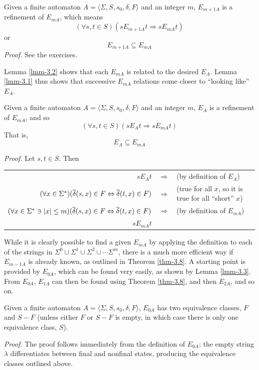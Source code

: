 \begin{lmm}\label{lmm-3.1}
Given a finite automaton $A =\langle\Sigma,S,s_0,\delta,F\rangle$ and an integer
$m$, $E_{m+1A}$ is a refinement of $E_{mA}$, which means
\[ (\forall s,t \in S)(s E_{m+1A}t \Rightarrow s E_{mA}t) \]
or
\[ E_{m+1A} \subseteq E_{mA} \]
\emph{Proof.} See the exercises.
\end{lmm}

Lemma \ref{lmm-3.2} shows that each $E_{mA}$ is related to the desired $E_A$. Lemma \ref{lmm-3.1}
thus shows that successive $E_{mA}$ relations come closer to ``looking like''
$E_A$.

\begin{lmm}\label{lmm-3.2}
Given a finite automaton $A =\langle\Sigma,S,s_0,\delta,F\rangle$ and an integer
$m$, $E_A$ is a refinement of $E_{mA}$, and so
\[ (\forall s,t \in S)(s E_A t \Rightarrow s E_{mA} t) \]
That is,
\[ E_A \subseteq E_{mA} \]

\emph{Proof.} Let $s,t \in S$. Then
\begin{center}
\begin{tabular}{rcl}
$s E_A t$ & $\Rightarrow$ & (by definition of $E_A$) \\
$(\forall x \in \Sigma^*)(\overline{\delta}(s,x) \in F \Leftrightarrow \overline{\delta}(t,x) \in F)$ &
  $\Rightarrow$ & (true for all $x$, so it is true for all ``short'' $x$)\\
$(\forall x \in \Sigma^* \ni |x| \leq m)(\overline{\delta}(s,x) \in F \Leftrightarrow
\overline{\delta}(t,x) \in F)$ & $\Rightarrow$ & (by definition of $E_{mA}$) \\
$s E_{mA} t$
\end{tabular}
\end{center}
\end{lmm}

While it is clearly possible to find a given $E_{mA}$ by applying the definition
to each of the strings in $\Sigma^0 \cup \Sigma^1 \cup \Sigma^2 \cup \cdots
\Sigma^m$, there is a much more efficient way if $E_{m-1A}$ is already known, as
outlined in Theorem \ref{thm-3.8}. A starting point is provided by $E_{0A}$, which can be
found very easily, as shown by Lemma \ref{lmm-3.3}. From $E_{0A}$, $E_{1A}$ can then be
found using Theorem \ref{thm-3.8}, and then $E_{2A}$, and so on.

\begin{lmm}\label{lmm-3.3}
Given a finite automaton $A=\langle\Sigma,S,s_0,\delta,F\rangle$, $E_{0A}$ has
two equivalence classes, $F$ and $S-F$ (unless either $F$ or $S-F$ is empty, in
which case there is only one equivalence class, $S$).

\emph{Proof.} The proof follows immediately from the definition of $E_{0A}$; the
empty string $\lambda$ differentiates between final and nonfinal states,
producing the equivalence classes outlined above.
\end{lmm}


